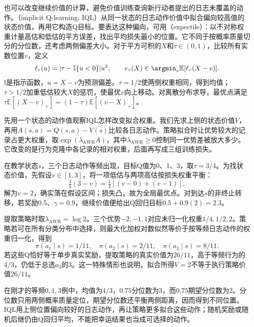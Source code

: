 也可以改变继续价值的计算，避免价值训练查询新行动者提出的日志未覆盖的动作。（implicit Q-learning, IQL）从同一状态的日志动作价值中拟合偏向较高值的状态价值，再用它构造Q目标。要表达这种偏向，可用（expectile）：以不对称权重计量高估和低估的平方误差，找出平均损失最小的位置。它不同于按概率质量切分的分位数，还考虑两侧偏差大小。对于平方可积的$X$和$\tau\in(0,1)$，比较所有实数位置$v$，定义
\begin{equation}
  \label{eq:rl-information-expectile}
  \ell_\tau(u)=|\tau-\mathbb I\{u<0\}|u^2,\qquad
  e_\tau(X)\in\argmin_v\mathbb E[\ell_\tau(X-v)].
\end{equation}
$\mathbb I$是指示函数，$u=X-v$为预测偏差。$\tau=1/2$使两侧权重相同，得到均值；$\tau>1/2$加重低估较大$X$的惩罚，使最优$v$向上移动。对离散分布求导，最优点满足
$\tau\mathbb E[(X-v)_+]=(1-\tau)\mathbb E[(v-X)_+]$。

先用一个状态的动作值观察IQL怎样改变拟合权重。我们先求上侧的状态价值$V$，再用$A(s,a)=Q(s,a)-V(s)$比较各日志动作。策略拟合时让优势较大的记录占更大权重，取$\exp(\lambda_{\mathrm{AWR}}A)$，其中$\lambda_{\mathrm{AWR}}\geq0$控制同一优势差被放大多少。它改变的是行为克隆中各记录的相对权重，后面再写成三组训练损失。

\begin{example}[三个动作的IQL更新与提取]
  \label{ex:rl-information-iql}
  在教学状态$s$，三个日志动作等频出现，目标Q值为0、1、3，取$\tau=3/4$。为找状态价值，先假设$v\in[1,3]$，将一项低估与两项高估按损失权重平衡：
  \[
    \tfrac34(3-v)=\tfrac14[(v-0)+(v-1)],
  \]
  解为$v=2$，确实落在假设区间；损失凸，故为全局最优点。对到达$s$的非终止转移，若奖励0.5、$\gamma=0.9$，继续价值便给出Q回归目标$0.5+0.9(2)=2.3$。

  提取策略时取$\lambda_{\mathrm{AWR}}=\log2$。三个优势$-2,-1,1$对应未归一化权重$1/4,1/2,2$。策略若可在所有分类分布中选择，则最大化加权对数似然等价于按等频日志动作的权重归一化，得到
  \[
    \pi(a_1\mid s)=1/11,\quad
    \pi(a_2\mid s)=2/11,\quad
    \pi(a_3\mid s)=8/11.
  \]
  若这些Q恰好等于单步真实奖励，提取策略的真实价值为$26/11$，高于等频行为的$4/3$，仍低于总选$a_3$的3。这一特殊情形也说明，拟合所得$V=2$不等于执行策略价值$26/11$。
\end{example}

在刚才的等频$0,1,3$例中，均值为$4/3$，$0.75$分位数为3，而$0.75$期望分位数为2。分位数只用两侧概率质量定位，期望分位数还平衡两侧距离，因而得到不同位置。IQL用上侧位置偏向较好的日志动作，再让策略更多拟合这些动作；随机奖励或随机后继仍由Q回归平均，不能把幸运结果也当成可选择的动作。

